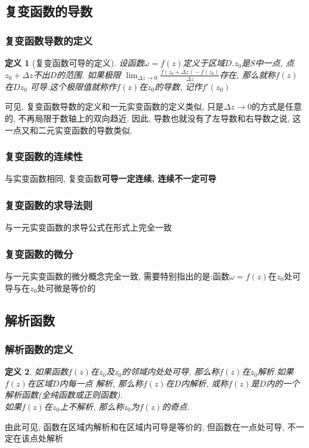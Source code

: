 \documentclass[12pt, a4paper, oneside]{ctexart}
\theoremstyle{plain}
\newtheorem{definition}{定义}[section]
\theoremstyle{definition}
\theoremstyle{definition}
\begin{document}
\subsection{复变函数的导数}

\subsubsection{复变函数导数的定义}
\begin{definition}[复变函数可导的定义]
    设函数$\omega=f(z)$定义于区域$D$.$z_{0}$是$S$中一点, 点$z_{0}+\Delta z$不出$D$的范围. 如果极限
    $\lim_{\Delta z\to0}\frac{f(z_{0}+\Delta z)-f(z_{0})}{\Delta z}$存在, 那么就称$f(z)$在$Dz_{0}$
    可导.这个极限值就称作$f(z)$在$z_{0}$的导数, 记作$f'(z_{0})$
\end{definition}

可见, 复变函数导数的定义和一元实变函数的定义类似, 只是$\Delta z\to 0$的方式是任意的, 不再局限于数轴上的双向趋近. 
因此, 导数也就没有了左导数和右导数之说, 这一点又和二元实变函数的导数类似.

\subsubsection{复变函数的连续性}
与实变函数相同, 复变函数\textbf{可导一定连续, 连续不一定可导}

\subsubsection{复变函数的求导法则}
与一元实变函数的求导公式在形式上完全一致

\subsubsection{复变函数的微分}
与一元实变函数的微分概念完全一致, 需要特别指出的是:函数$\omega=f(z)$在$z_{0}$处可导与在$z_{0}$处可微是等价的

\subsection{解析函数}
\subsubsection{解析函数的定义}
\begin{definition}
    如果函数$f(z)$在$z_{0}$及$z_{0}$的邻域内处处可导, 那么称$f(z)$在$z_{0}$解析.如果$f(z)$在区域$D$内每一点
    解析, 那么称$f(z)$在$D$内解析, 或称$f(z)$是$D$内的一个解析函数(全纯函数或正则函数).\\
    如果$f(z)$在$z_{0}$上不解析, 那么称$z_{0}$为$f(z)$的奇点.
\end{definition}
由此可见, 函数在区域内解析和在区域内可导是等价的, 但函数在一点处可导, 不一定在该点处解析
\end{document}

